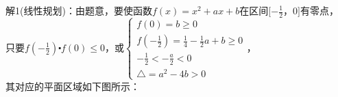 
解1(线性规划)：由题意，要使函数$f(x)=x^{2}+ax+b$在区间$[-\frac{1}{2}$，$0]$有零点，\\只要$f(-\frac{1}{2})\centerdot f(0)\leqslant 0$，或$\left\{\begin{array}{l}{f(0)=b\geqslant 0}\\ {f(-\frac{1}{2})=\frac{1}{4}-\frac{1}{2}a+b\geqslant 0}\\ {-\frac{1}{2}<-\frac{a}{2}<0}\\ {\triangle {=a}^{2}-4b>0}\end{array}\right.$，\\其对应的平面区域如下图所示：